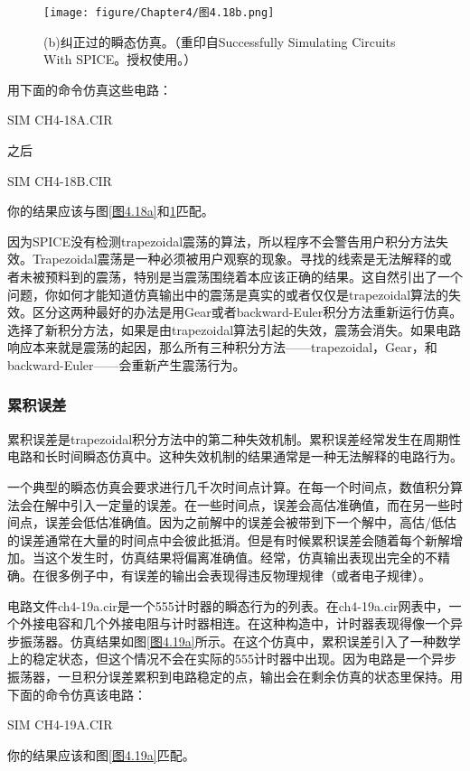 \begin{figure}[htbp]
\small
    \centering
    \texttt{[image: figure/Chapter4/图4.18b.png]}
    \caption{(b)纠正过的瞬态仿真。（重印自Successfully Simulating Circuits With SPICE。授权使用。）}
    \label{图4.18b}
\end{figure}

用下面的命令仿真这些电路：

SIM CH4-18A.CIR

之后

SIM CH4-18B.CIR

你的结果应该与图\ref{图4.18a}和\ref{图4.18b}匹配。

因为SPICE没有检测trapezoidal震荡的算法，所以程序不会警告用户积分方法失效。Trapezoidal震荡是一种必须被用户观察的现象。寻找的线索是无法解释的或者未被预料到的震荡，特别是当震荡围绕着本应该正确的结果。这自然引出了一个问题，你如何才能知道仿真输出中的震荡是真实的或者仅仅是trapezoidal算法的失效。区分这两种最好的办法是用Gear或者backward-Euler积分方法重新运行仿真。选择了新积分方法，如果是由trapezoidal算法引起的失效，震荡会消失。如果电路响应本来就是震荡的起因，那么所有三种积分方法——trapezoidal，Gear，和backward-Euler——会重新产生震荡行为。
\subsubsection{累积误差}
累积误差是trapezoidal积分方法中的第二种失效机制。累积误差经常发生在周期性电路和长时间瞬态仿真中。这种失效机制的结果通常是一种无法解释的电路行为。

一个典型的瞬态仿真会要求进行几千次时间点计算。在每一个时间点，数值积分算法会在解中引入一定量的误差。在一些时间点，误差会高估准确值，而在另一些时间点，误差会低估准确值。因为之前解中的误差会被带到下一个解中，高估/低估的误差通常在大量的时间点中会彼此抵消。但是有时候累积误差会随着每个新解增加。当这个发生时，仿真结果将偏离准确值。经常，仿真输出表现出完全的不精确。在很多例子中，有误差的输出会表现得违反物理规律\cite{chap4-6}（或者电子规律）。

电路文件ch4-19a.cir是一个555计时器的瞬态行为的列表。在ch4-19a.cir网表中，一个外接电容和几个外接电阻与计时器相连。在这种构造中，计时器表现得像一个异步振荡器。仿真结果如图\ref{图4.19a}所示。在这个仿真中，累积误差引入了一种数学上的稳定状态，但这个情况不会在实际的555计时器中出现。因为电路是一个异步振荡器，一旦积分误差累积到电路稳定的点，输出会在剩余仿真的状态里保持。用下面的命令仿真该电路：

SIM CH4-19A.CIR

你的结果应该和图\ref{图4.19a}匹配。

